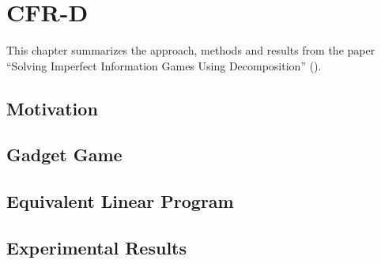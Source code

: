\chapter{CFR-D}

This chapter summarizes the approach, methods and results from the paper ``Solving Imperfect Information Games Using Decomposition'' (\cite{BurchJohansonBowling13}).

\section{Motivation}

\section{Gadget Game}

\section{Equivalent Linear Program}

\section{Experimental Results}
